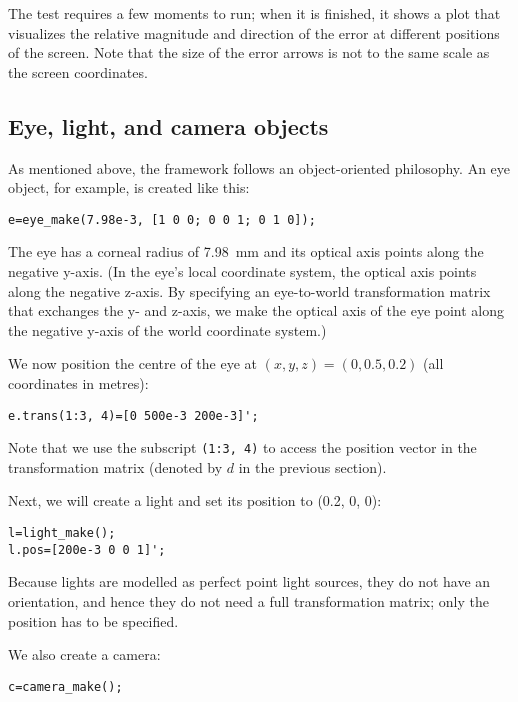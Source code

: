 \documentclass{scrartcl}
\begin{document}
The test requires a few moments to run; when it is finished, it shows a plot
that visualizes the relative magnitude and direction of the error at different
positions of the screen. Note that the size of the error arrows is not to the
same scale as the screen coordinates.

\subsection*{Eye, light, and camera objects}

As mentioned above, the framework follows an object-oriented philosophy. An
eye object, for example, is created like this:

\begin{verbatim}
e=eye_make(7.98e-3, [1 0 0; 0 0 1; 0 1 0]);
\end{verbatim}

The eye has a corneal radius of 7.98~mm and its optical axis points along 
the negative y-axis. (In the eye's local coordinate system, the optical axis
points along the negative z-axis. By specifying an eye-to-world transformation
matrix that exchanges the y- and z-axis, we make the optical axis of the eye
point along the negative y-axis of the world coordinate system.)

We now position the centre of the eye at $(x, y, z)=(0, 0.5, 0.2)$ (all
coordinates in metres):

\begin{verbatim}
e.trans(1:3, 4)=[0 500e-3 200e-3]';
\end{verbatim}

Note that we use the subscript \texttt{(1:3, 4)} to access the position 
vector in the transformation matrix (denoted by $d$ in the previous section).

Next, we will create a light and set its position to (0.2, 0, 0):

\begin{verbatim}
l=light_make();
l.pos=[200e-3 0 0 1]';
\end{verbatim}

Because lights are modelled as perfect point light sources, they do not have
an orientation, and hence they do not need a full transformation matrix; only
the position has to be specified.

We also create a camera:

\begin{verbatim}
c=camera_make();
\end{verbatim}
\end{document}
